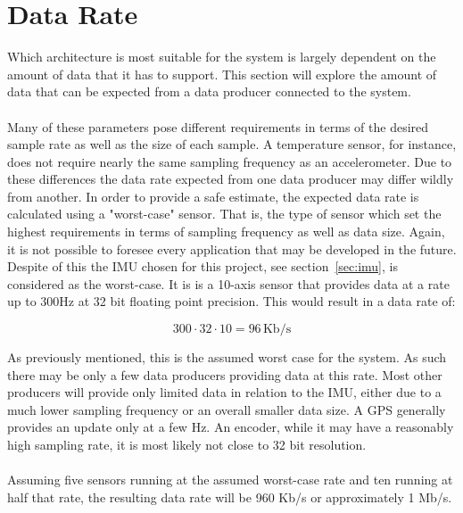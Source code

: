 
\section{Data Rate}
Which architecture is most suitable for the system is largely dependent on the amount of data that it has to support.
This section will explore the amount of data that can be expected from a data producer connected to the system.
\\~\\
Many of these parameters pose different requirements in terms of the desired sample rate as well as the size of each sample.
A temperature sensor, for instance, does not require nearly the same sampling frequency as an accelerometer.
Due to these differences the data rate expected from one data producer may differ wildly from another.
In order to provide a safe estimate, the expected data rate is calculated using a "worst-case" sensor.
That is, the type of sensor which set the highest requirements in terms of sampling frequency as well as data size.
Again, it is not possible to foresee every application that may be developed in the future.
Despite of this the IMU chosen for this project, see section~\ref{sec:imu}, is considered as the worst-case.
It is is a 10-axis sensor that provides data at a rate up to 300\si{\hertz} at 32 bit floating point precision.
This would result in a data rate of:

$$300\cdot32\cdot10=96\,\text{Kb/s}$$

As previously mentioned, this is the assumed worst case for the system.
As such there may be only a few data producers providing data at this rate.
Most other producers will provide only limited data in relation to the IMU, either due to a much lower sampling frequency or an overall smaller data size.
A GPS generally provides an update only at a few \si{\hertz}. 
An encoder, while it may have a reasonably high sampling rate, it is most likely not close to 32 bit resolution.
\\~\\
Assuming five sensors running at the assumed worst-case rate and ten running at half that rate, the resulting data rate will be 960 Kb/s or approximately 1 Mb/s.


